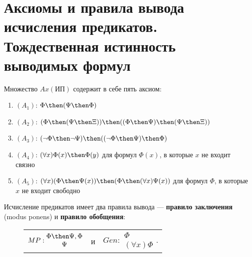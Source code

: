 \section{Аксиомы и правила вывода исчисления предикатов. Тождественная истинность выводимых формул}
Множество $Ax(\text{ИП})$ содержит в себе пять аксиом:

\begin{enumerate}
    \item $(A_1)$: $\Phi \then (\Psi \then \Phi)$
    \item $(A_2)$: $(\Phi \then (\Psi \then \Xi)) \then ((\Phi \then \Psi) \then (\Psi \then \Xi))$
    \item $(A_3)$: $(\lnot \Phi \then \lnot \Psi) \then ((\lnot \Phi \then \Psi) \then \Phi)$
    \item $(A_4)$: $(\forall x)\Phi(x) \then \Phi(y)$ для формул $\Phi(x)$, в которые $x$ не входит связно
    \item $(A_5)$: $(\forall x)(\Phi \then \Psi(x)) \then (\Phi \then (\forall x)\Psi(x))$ для формул $\Phi$, в которые $x$ не входит свободно
\end{enumerate}

Исчисление предикатов имеет два правила вывода --- \textbf{правило заключения} (modus ponens) и \textbf{правило обобщения}:

\begin{figure}[H]
    \centering
    \begin{tabular*}{0.5\textwidth}{@{\extracolsep{\fill}}ccc@{}}
        $MP: \begin{matrix}
            \Phi \then \Psi, \Phi \\
            \Psi
        \end{matrix}$ &
        и &
        $Gen: \begin{matrix}
            \Phi \\
            (\forall x)\Phi
        \end{matrix}$.
    \end{tabular*}
\end{figure}